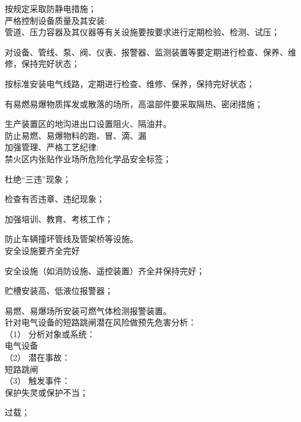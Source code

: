  按规定采取防静电措施；\\

严格控制设备质量及其安装:\\

 管道、压力容器及其仪器等有关设施要按要求进行定期检验、检测、试压；

 对设备、管线、泵、阀、仪表、报警器、监测装置等要定期进行检查、保养、维修，保持完好状态；

 按标准安装电气线路，定期进行检查、维修、保养，保持完好状态；

 有易燃易爆物质挥发或散落的场所，高温部件要采取隔热、密闭措施；

 生产装置区的地沟进出口设置阻火、隔油井。\\

防止易燃、易爆物料的跑、冒、滴、漏\\

加强管理、严格工艺纪律:\\

 禁火区内张贴作业场所危险化学品安全标签；

 杜绝“三违”现象；

 检查有否违章、违纪现象；

 加强培训、教育、考核工作；

 防止车辆撞坏管线及管架桥等设施。\\

安全设施要齐全完好

 安全设施（如消防设施、遥控装置）齐全并保持完好；

 贮槽安装高、低液位报警器；

易燃、易爆场所安装可燃气体检测报警装置。\\

针对电气设备的短路跳闸潜在风险做预先危害分析：\\

（1） 分析对象或系统：\\

电气设备\\

（2） 潜在事故：\\

短路跳闸\\

（3） 触发事件：\\

 保护失灵或保护不当；

 过载；

